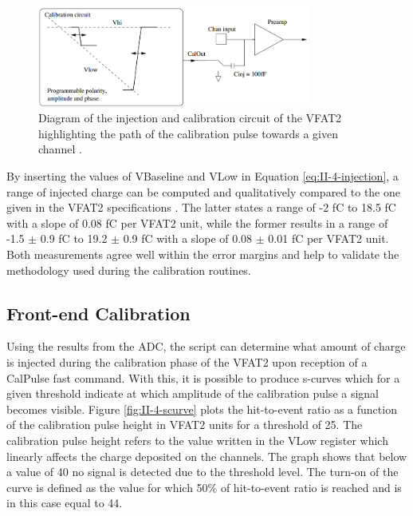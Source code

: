       \begin{figure}[h!]
        \centering
        \includegraphics[width=0.8\textwidth]{img/II-4-qualification/injection.png}
        \caption{Diagram of the injection and calibration circuit of the VFAT2 highlighting the path of the calibration pulse towards a given channel \cite{Aspell:1267947}.}
        \label{fig:II-4-injection}
      \end{figure}

      By inserting the values of VBaseline and VLow in Equation \ref{eq:II-4-injection}, a range of injected charge can be computed and qualitatively compared to the one given in the VFAT2 specifications \cite{Aspell:1267947}. The latter states a range of -2 fC to 18.5 fC with a slope of 0.08 fC per VFAT2 unit, while the former results in a range of -1.5 $\pm$ 0.9 fC to 19.2 $\pm$ 0.9 fC with a slope of 0.08 $\pm$ 0.01 fC per VFAT2 unit. Both measurements agree well within the error margins and help to validate the methodology used during the calibration routines.

    \subsection{Front-end Calibration}

      Using the results from the ADC, the script can determine what amount of charge is injected during the calibration phase of the VFAT2 upon reception of a CalPulse fast command. With this, it is possible to produce s-curves which for a given threshold indicate at which amplitude of the calibration pulse a signal becomes visible. Figure \ref{fig:II-4-scurve} plots the hit-to-event ratio as a function of the calibration pulse height in VFAT2 units for a threshold of 25. The calibration pulse height refers to the value written in the VLow register which linearly affects the charge deposited on the channels. The graph shows that below a value of 40 no signal is detected due to the threshold level. The turn-on of the curve is defined as the value for which 50\% of hit-to-event ratio is reached and is in this case equal to 44. \\

